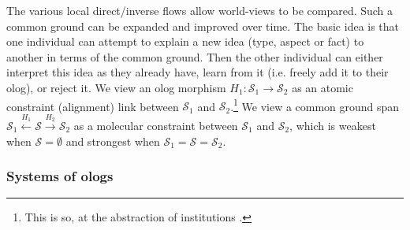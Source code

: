 \documentclass{amsart}
\def\to{\rightarrow}
\theoremstyle{remark}
\theoremstyle{definition}
\begin{document}
The various local direct/inverse flows allow world-views to be compared. 
%
Such a common ground can be expanded and improved over time. 
The basic idea is that one individual can attempt to explain a new idea (type, aspect or fact) to another
in terms of the common ground. 
Then the other individual can either interpret this idea as they already have, 
learn from it (i.e. freely add it to their olog), or reject it. 
%
We view an olog morphism $H_{1} \colon \mathcal{S}_{1} \to \mathcal{S}_{2}$ 
as an atomic constraint (alignment) link between $\mathcal{S}_{1}$ and $\mathcal{S}_{2}$.\footnote{This is so, at the abstraction of institutions \cite{K:SC}.}
We view a common ground span 
$\mathcal{S}_{1} \xleftarrow{H_{1}} \mathcal{S} \xrightarrow{H_{2}} \mathcal{S}_{2}$ 
as a molecular constraint between $\mathcal{S}_{1}$ and $\mathcal{S}_{2}$,
which is weakest when $\mathcal{S} = \emptyset$ 
and strongest when $\mathcal{S}_{1} = \mathcal{S} = \mathcal{S}_{2}$. 

\subsubsection{Systems of ologs}
\end{document}

